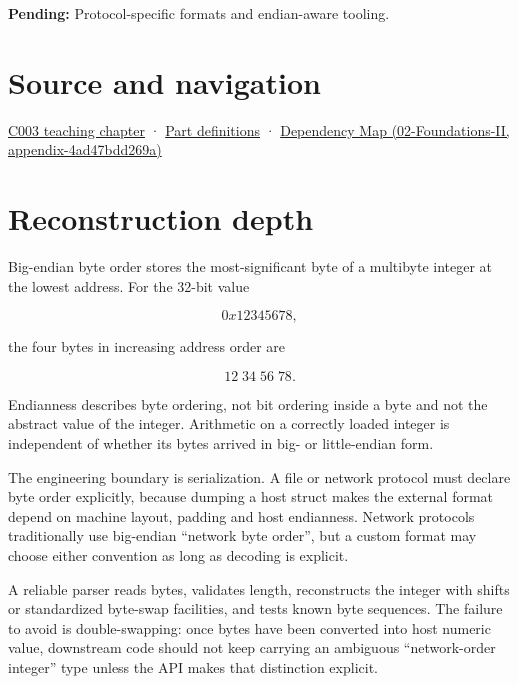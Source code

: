 \textbf{Pending:} Protocol-specific formats and endian-aware tooling.

\section{Source and navigation}\label{appendix-92e040df969a-source-and-navigation}

\href{Continuous\%20Notes/Computing\%20Foundations\%20-\%20From\%20Bits\%20to\%20C++\%20and\%20Systems\%20APIs\#Where\%20the\%20bytes\%20live}{C003 teaching chapter} · \hyperref[appendix-fd090d982a15-m003---parts-41-60]{Part definitions} · \href{../02-Foundations-II/main.pdf\#nameddest=appendix-4ad47bdd269a}{Dependency Map (02-Foundations-II, appendix-4ad47bdd269a)}

\section{Reconstruction depth}\label{appendix-92e040df969a-reconstruction-depth}

Big-endian byte order stores the most-significant byte of a multibyte integer at the lowest address. For the 32-bit value

\[
0x12345678,
\]

the four bytes in increasing address order are

\[
12\;34\;56\;78.
\]

Endianness describes byte ordering, not bit ordering inside a byte and not the abstract value of the integer. Arithmetic on a correctly loaded integer is independent of whether its bytes arrived in big- or little-endian form.

The engineering boundary is serialization. A file or network protocol must declare byte order explicitly, because dumping a host struct makes the external format depend on machine layout, padding and host endianness. Network protocols traditionally use big-endian ``network byte order'', but a custom format may choose either convention as long as decoding is explicit.

A reliable parser reads bytes, validates length, reconstructs the integer with shifts or standardized byte-swap facilities, and tests known byte sequences. The failure to avoid is double-swapping: once bytes have been converted into host numeric value, downstream code should not keep carrying an ambiguous ``network-order integer'' type unless the API makes that distinction explicit.
